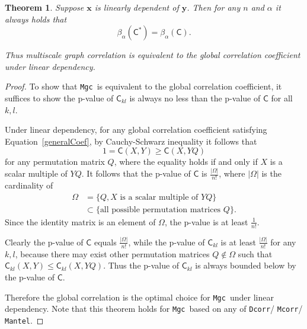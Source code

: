 \documentclass[11pt]{article}
\providecommand{\sct}[1]{{\sc \texttt{#1}}}
\providecommand{\mb}[1]{\boldsymbol{#1}}
\newcommand{\G}{\mathsf{C}}
\newcommand{\Mgc}{\sct{Mgc}}
\newcommand{\Dcorr}{\sct{Dcorr}}
\newcommand{\Mcorr}{\sct{Mcorr}}
\newcommand{\Mantel}{\sct{Mantel}}
\newtheorem{appThm}{Theorem}
\begin{document}
\begin{appThm}
Suppose $\mb{x}$ is linearly dependent of $\mb{y}$. Then for any $n$ and $\alpha$ it always holds that
\begin{equation}
\beta_{\alpha}(\G^{*}) = \beta_{\alpha}(\G).
\end{equation}

Thus multiscale graph correlation is equivalent to the global correlation coefficient under linear dependency.
\end{appThm}
\begin{proof}
To show that \Mgc~is equivalent to the global correlation coefficient, it suffices to show the p-value of $\G_{kl}$ is always no less than the p-value of $\G$ for all $k,l$.

Under linear dependency, for any global correlation coefficient satisfying Equation~\ref{generalCoef}, by Cauchy-Schwarz inequality it follows that
\begin{equation}
1=\G(X, Y) \geq \G(X, YQ)
\end{equation}
for any permutation matrix $Q$, where the equality holds if and only if $X$ is a scalar multiple of $YQ$. It follows that the p-value of $\G$ is $\frac{|\Omega|}{n!}$, where $|\Omega|$ is the cardinality of 
\begin{align*}
\Omega &=\{Q, X \mbox{ is a scalar multiple of }YQ\} \\
&\subset \{\mbox{all possible permutation matrices }Q\}. 
\end{align*}
Since the identity matrix is an element of $\Omega$, the p-value is at least $\frac{1}{n!}$.

Clearly the p-value of $\G$ equals $\frac{|\Omega|}{n!}$, while the p-value of $\G_{kl}$ is at least $\frac{|\Omega|}{n!}$ for any $k,l$, because there may exist other permutation matrices $Q \notin \Omega$ such that $\G_{kl}(X,Y) \leq \G_{kl}(X,YQ)$. Thus the p-value of $\G_{kl}$ is always bounded below by the p-value of $\G$.

Therefore the global correlation is the optimal choice for \Mgc~under linear dependency. Note that this theorem holds for \Mgc~based on any of \Dcorr / \Mcorr / \Mantel.
\end{proof}
\end{document}
